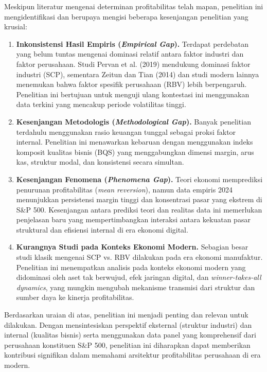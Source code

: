 \documentclass[12pt,a4paper]{report}
\begin{document}
Meskipun literatur mengenai determinan profitabilitas telah mapan, penelitian ini mengidentifikasi dan berupaya mengisi beberapa kesenjangan penelitian yang krusial:

\begin{enumerate}
    \item \textbf{Inkonsistensi Hasil Empiris (\textit{Empirical Gap}).} Terdapat perdebatan yang belum tuntas mengenai dominasi relatif antara faktor industri dan faktor perusahaan. Studi Pervan et al. (2019) mendukung dominasi faktor industri (SCP), sementara Zeitun dan Tian (2014) dan studi modern lainnya menemukan bahwa faktor spesifik perusahaan (RBV) lebih berpengaruh. Penelitian ini bertujuan untuk menguji ulang kontestasi ini menggunakan data terkini yang mencakup periode volatilitas tinggi.
    \item \textbf{Kesenjangan Metodologis (\textit{Methodological Gap}).} Banyak penelitian terdahulu menggunakan rasio keuangan tunggal sebagai proksi faktor internal. Penelitian ini menawarkan kebaruan dengan menggunakan indeks komposit kualitas bisnis (BQS) yang menggabungkan dimensi margin, arus kas, struktur modal, dan konsistensi secara simultan.
    \item \textbf{Kesenjangan Fenomena (\textit{Phenomena Gap}).} Teori ekonomi memprediksi penurunan profitabilitas (\textit{mean reversion}), namun data empiris 2024 menunjukkan persistensi margin tinggi dan konsentrasi pasar yang ekstrem di S\&P 500. Kesenjangan antara prediksi teori dan realitas data ini memerlukan penjelasan baru yang mempertimbangkan interaksi antara kekuatan pasar struktural dan efisiensi internal di era ekonomi digital.
    \item \textbf{Kurangnya Studi pada Konteks Ekonomi Modern.} Sebagian besar studi klasik mengenai SCP vs. RBV dilakukan pada era ekonomi manufaktur. Penelitian ini menempatkan analisis pada konteks ekonomi modern yang didominasi oleh aset tak berwujud, efek jaringan digital, dan \textit{winner-takes-all dynamics}, yang mungkin mengubah mekanisme transmisi dari struktur dan sumber daya ke kinerja profitabilitas.
\end{enumerate}

Berdasarkan uraian di atas, penelitian ini menjadi penting dan relevan untuk dilakukan. Dengan mensintesiskan perspektif eksternal (struktur industri) dan internal (kualitas bisnis) serta menggunakan data panel yang komprehensif dari perusahaan konstituen S\&P 500, penelitian ini diharapkan dapat memberikan kontribusi signifikan dalam memahami arsitektur profitabilitas perusahaan di era modern.
\end{document}
